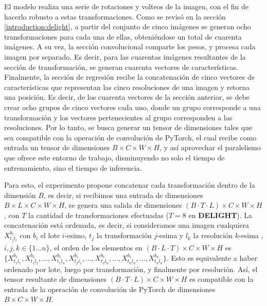 \documentclass[../tesis.tex]{subfiles}
\begin{document}
El modelo realiza una serie de rotaciones y volteos de la imagen, con el fin de hacerlo robusto a estas transformaciones. Como se revisó en la sección \ref{introduction:delight}, a partir del conjunto de cinco imágenes se generan ocho transformaciones para cada una de ellas, obteniéndose un total de cuarenta imágenes. A su vez, la sección convolucional comparte los pesos, y procesa cada imagen por separado. Es decir, para las cuarentas imágenes resultantes de la sección de transformación, se generan cuarenta vectores de características. Finalmente, la sección de regresión recibe la concatenación de cinco vectores de características que representan las cinco resoluciones de una imagen y retorna una posición. Es decir, de los cuarenta vectores de la sección anterior, se debe crear ocho grupos de cinco vectores cada uno, donde un grupo corresponde a una transformación y los vectores pertenecientes al grupo corresponden a las resoluciones. Por lo tanto, se busca generar un tensor de dimensiones tales que sea compatible con la operación de convolución de PyTorch, el cual recibe como entrada un tensor de dimensiones $B\times C\times W \times H$, y así aprovechar el paralelismo que ofrece este entorno de trabajo, disminuyendo no solo el tiempo de entrenamiento, sino el tiempo de inferencia.\par\null\par

Para esto, el experimento propone concatenar cada transformación dentro de la dimensión $B$, es decir, si recibimos una entrada de dimensiones $B\times L\times C\times W\times H$, se genera una salida de dimensiones $(B \cdot T \cdot L)\times C\times W\times H$, con $T$ la cantidad de transformaciones efectuadas ($T=8$ en \textbf{DELIGHT}). La concatenación está ordenada, es decir, si consideramos una imagen cualquiera $X^{b_i}_{{t_j}{t_l}}$ con $b_i$ el lote $i$-esimo, $t_j$ la transformación $j$-esima y $l_k$ la resolución $k$-esima , $i,j,k \in \{1...n\}$, el orden de los elementos en $(B \cdot L \cdot T)\times C\times W\times H$ es $\{X^{b_1}_{{t_1}{l_1}}, X^{b_1}_{{t_1}{l_2}}, ..., X^{b_1}_{{t_1}{l_n}}, X^{b_1}_{{t_2}{l_1}}, ..., X^{b_1}_{{t_2}{l_n}}, ..., X^{b_1}_{{t_n}{l_n}}, ..., X^{b_n}_{{t_n}{l_n}}\}$. Esto es equivalente a haber ordenado por lote, luego por transformación, y finalmente por resolución. Así, el tensor resultante de dimensiones $(B \cdot T \cdot L)\times C\times W\times H$ es compatible con la entrada de la operación de convolución de PyTorch de dimensiones $B\times C\times W \times H$.\par\null\par
\end{document}
